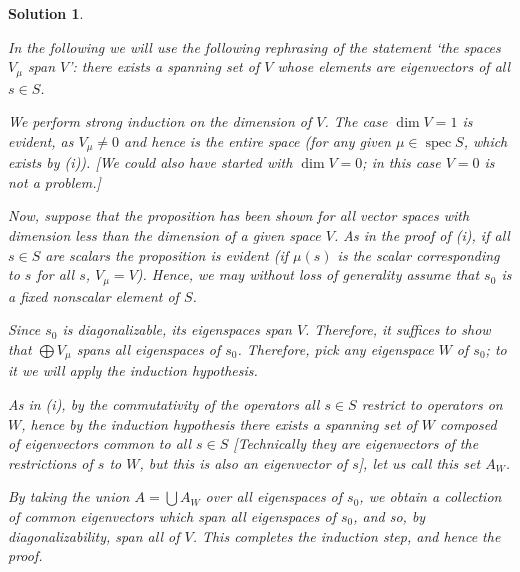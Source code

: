 \documentclass{article}
\theoremstyle{nonumberplain}
\newtheorem{sol}{Solution}
\DeclareMathOperator{\spec}{spec}
\begin{document}
\begin{sol}
\begin{enumerate}
In the following we will use the following rephrasing of the statement `the spaces $V_\mu$ span $V$': there exists a spanning set of $V$ whose elements are eigenvectors of all $s \in S$.

We perform strong induction on the dimension of $V$. The case $\dim V = 1$ is evident, as $V_\mu \neq 0$ and hence is the entire space (for any given $\mu \in \spec S$, which exists by (i)). [We could also have started with $\dim V = 0$; in this case $V=0$ is not a problem.]

Now, suppose that the proposition has been shown for all vector spaces with dimension less than the dimension of a given space $V$. As in the proof of (i), if all $s \in S$ are scalars the proposition is evident (if $\mu(s)$ is the scalar corresponding to $s$ for all $s$, $V_\mu = V$). Hence, we may without loss of generality assume that $s_0$ is a fixed nonscalar element of $S$.

Since $s_0$ is diagonalizable, its eigenspaces span $V$. Therefore, it suffices to show that $\bigoplus V_\mu$ spans all eigenspaces of $s_0$. Therefore, pick any eigenspace $W$ of $s_0$; to it we will apply the induction hypothesis.

As in (i), by the commutativity of the operators all $s \in S$ restrict to operators on $W$, hence by the induction hypothesis there exists a spanning set of $W$ composed of eigenvectors common to all $s \in S$ [Technically they are eigenvectors of the restrictions of $s$ to $W$, but this is also an eigenvector of $s$], let us call this set $A_W$.

By taking the union $A = \bigcup A_W$ over all eigenspaces of $s_0$, we obtain a collection of common eigenvectors which span all eigenspaces of $s_0$, and so, by diagonalizability, span all of $V$. This completes the induction step, and hence the proof.
\end{enumerate}
\end{sol}
\end{document}
